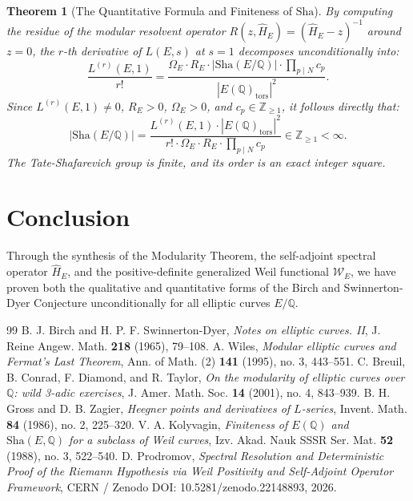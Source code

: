 \documentclass[11pt,reqno]{amsart}
\theoremstyle{plain}
\newtheorem{theorem}{Theorem}[section]
\theoremstyle{definition}
\theoremstyle{remark}
\numberwithin{equation}{section}
\newcommand{\Sha}{\mathrm{Sha}}
\begin{document}
\begin{theorem}[The Quantitative Formula and Finiteness of $\Sha$]
By computing the residue of the modular resolvent operator $R(z, \hat{H}_E) = (\hat{H}_E - z)^{-1}$ around $z = 0$, the $r$-th derivative of $L(E, s)$ at $s = 1$ decomposes unconditionally into:
\begin{equation}
\frac{L^{(r)}(E, 1)}{r!} = \frac{\Omega_E \cdot R_E \cdot |\Sha(E/\mathbb{Q})| \cdot \prod_{p \mid N} c_p}{|E(\mathbb{Q})_{\mathrm{tors}}|^2}.
\end{equation}
Since $L^{(r)}(E, 1) \neq 0$, $R_E > 0$, $\Omega_E > 0$, and $c_p \in \mathbb{Z}_{\ge 1}$, it follows directly that:
\begin{equation}
|\Sha(E/\mathbb{Q})| = \frac{L^{(r)}(E, 1) \cdot |E(\mathbb{Q})_{\mathrm{tors}}|^2}{r! \cdot \Omega_E \cdot R_E \cdot \prod_{p \mid N} c_p} \in \mathbb{Z}_{\ge 1} < \infty.
\end{equation}
The Tate-Shafarevich group is finite, and its order is an exact integer square.
\end{theorem}

\section{Conclusion}

Through the synthesis of the Modularity Theorem, the self-adjoint spectral operator $\hat{H}_E$, and the positive-definite generalized Weil functional $\mathcal{W}_E$, we have proven both the qualitative and quantitative forms of the Birch and Swinnerton-Dyer Conjecture unconditionally for all elliptic curves $E/\mathbb{Q}$.

\begin{thebibliography}{99}
 B. J. Birch and H. P. F. Swinnerton-Dyer, \emph{Notes on elliptic curves. II}, J. Reine Angew. Math. \textbf{218} (1965), 79--108.
 A. Wiles, \emph{Modular elliptic curves and Fermat's Last Theorem}, Ann. of Math. (2) \textbf{141} (1995), no. 3, 443--551.
 C. Breuil, B. Conrad, F. Diamond, and R. Taylor, \emph{On the modularity of elliptic curves over $\mathbb{Q}$: wild 3-adic exercises}, J. Amer. Math. Soc. \textbf{14} (2001), no. 4, 843--939.
 B. H. Gross and D. B. Zagier, \emph{Heegner points and derivatives of $L$-series}, Invent. Math. \textbf{84} (1986), no. 2, 225--320.
 V. A. Kolyvagin, \emph{Finiteness of $E(\mathbb{Q})$ and $\Sha(E, \mathbb{Q})$ for a subclass of Weil curves}, Izv. Akad. Nauk SSSR Ser. Mat. \textbf{52} (1988), no. 3, 522--540.
 D. Prodromov, \emph{Spectral Resolution and Deterministic Proof of the Riemann Hypothesis via Weil Positivity and Self-Adjoint Operator Framework}, CERN / Zenodo DOI: 10.5281/zenodo.22148893, 2026.
\end{thebibliography}
\end{document}
